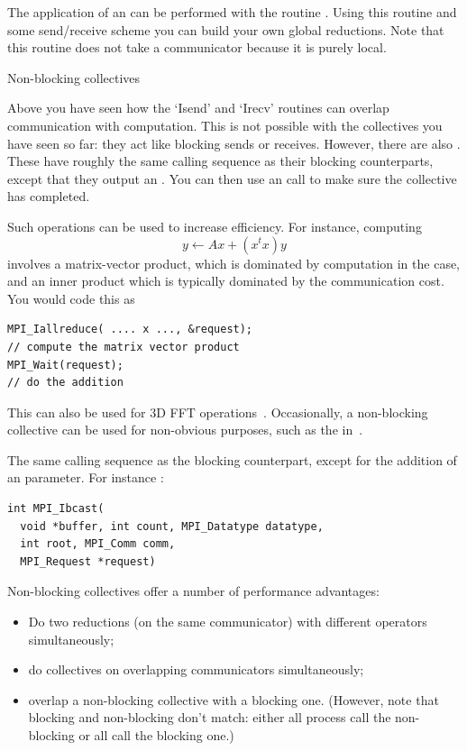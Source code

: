 The application of an  can be performed with the routine
. Using this routine and some
send/receive scheme you can build your own global reductions. Note
that this routine does not take a communicator because it is purely local.



 {Non-blocking collectives}
\label{sec:mpi3collect}

Above you have seen how the `Isend' and `Irecv' routines can overlap communication
with computation. This is not possible with the collectives you have seen so far:
they act like blocking sends or receives.
However, there are also .
These have roughly the same calling sequence as their blocking counterparts,
except that they output an . You
can then use an  call to make sure the collective
has completed.

Such operations can be used to increase efficiency.
For instance, computing
\[ y \leftarrow Ax + (x^tx)y \]
involves a matrix-vector product, which is dominated by computation
in the  case, and an inner product which is 
typically dominated by the communication cost. You would code this as
\begin{lstlisting}
MPI_Iallreduce( .... x ..., &request);
// compute the matrix vector product
MPI_Wait(request);
// do the addition
\end{lstlisting}

This can also be used for 3D FFT operations~\cite{Hoefler:case-for-nbc}.
Occasionally, a non-blocking collective can be used for non-obvious purposes,
such as the  in~\cite{Hoefler:2010:SCP}.

The same calling sequence as the blocking counterpart, except for the addition
of an  parameter. For instance 
:
\begin{lstlisting}
int MPI_Ibcast(
  void *buffer, int count, MPI_Datatype datatype,
  int root, MPI_Comm comm, 
  MPI_Request *request)
\end{lstlisting}

Non-blocking collectives offer a number of performance advantages:
\begin{itemize}
\item Do two reductions (on the same communicator) with different
  operators simultaneously;
\item do collectives on overlapping communicators simultaneously;
\item overlap a non-blocking collective with a blocking one. (However,
  note that blocking and non-blocking don't match: either all process 
  call the non-blocking or all call the blocking one.)
\end{itemize}

